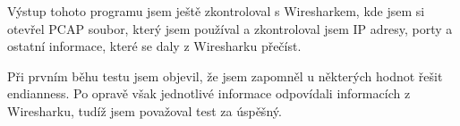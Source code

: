 \documentclass{article}
\begin{document}
Výstup tohoto programu jsem ještě zkontroloval s Wiresharkem, kde jsem si
otevřel PCAP soubor, který jsem používal a zkontroloval jsem IP adresy, porty
a ostatní informace, které se daly z Wiresharku přečíst.

Při prvním běhu testu jsem objevil, že jsem zapomněl u některých hodnot řešit
endianness. Po opravě však jednotlivé informace odpovídali informacích z
Wiresharku, tudíž jsem považoval test za úspěšný.

\nocite{*}
\printbibliography[title={Reference}]
\end{document}
